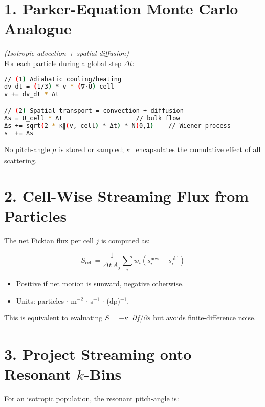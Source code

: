 \section*{1. Parker-Equation Monte Carlo Analogue}

\textit{(Isotropic advection + spatial diffusion)}\\

For each particle during a global step $\Delta t$:

\begin{lstlisting}[language=bash,basicstyle=\ttfamily\small]
// (1) Adiabatic cooling/heating
dv_dt = (1/3) * v * (∇·U)_cell
v += dv_dt * Δt

// (2) Spatial transport = convection + diffusion
Δs = U_cell * Δt                    // bulk flow
Δs += sqrt(2 * κ∥(v, cell) * Δt) * N(0,1)    // Wiener process
s  += Δs
\end{lstlisting}

No pitch-angle $\mu$ is stored or sampled; $\kappa_\parallel$ encapsulates the cumulative effect of all scattering.

\section*{2. Cell-Wise Streaming Flux from Particles}

The net Fickian flux per cell $j$ is computed as:

\begin{equation}
S_{\text{cell}} = \frac{1}{\Delta t \, A_j} \sum_i w_i \left( s_i^{\text{new}} - s_i^{\text{old}} \right)
\end{equation}

\begin{itemize}
\item Positive if net motion is sunward, negative otherwise.
\item Units: particles $\cdot$ m$^{-2}$ $\cdot$ s$^{-1}$ $\cdot$ (dp)$^{-1}$.
\end{itemize}

This is equivalent to evaluating $S = -\kappa_\parallel \, \partial f / \partial s$ but avoids finite-difference noise.

\section*{3. Project Streaming onto Resonant $k$-Bins}

For an isotropic population, the resonant pitch-angle is:

